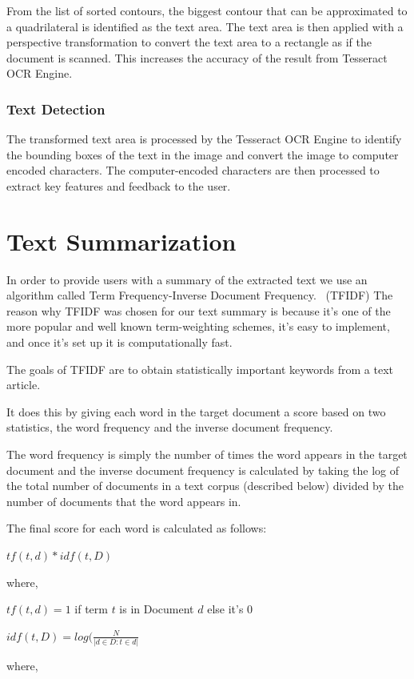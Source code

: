 From the list of sorted contours, the biggest contour that can be approximated to a quadrilateral is identified as the text area. The text area is then applied with a perspective transformation to convert the text area to a rectangle	 as if the document is scanned. This increases the accuracy of the result from Tesseract OCR Engine. 

\subsubsection{Text Detection}
The transformed text area is processed by the Tesseract OCR Engine to identify the bounding boxes of the text in the image and convert the image to computer encoded characters. The computer-encoded characters are then processed to extract key features and feedback to the user.

\section{Text Summarization}
In order to provide users with a summary of the extracted text we use an algorithm called Term Frequency-Inverse Document Frequency.\footnotemark {} ~(TFIDF) The reason why TFIDF was chosen for our text summary is because it's one of the more popular and well known term-weighting schemes, it's easy to implement, and once it's set up it is computationally fast.

The goals of TFIDF are to obtain statistically important keywords from a text article. 

It does this by giving each word in the target document a score based on two statistics, the word frequency and the inverse document frequency.

The word frequency is simply the number of times the word appears in the target document and the inverse document frequency is calculated by taking the log of the total number of documents in a text corpus (described below) divided by the number of documents that the word appears in.

The final score for each word is calculated as follows: 

	\forceindent $tf(t, d) * idf(t, D)$  

where,

	\forceindent $tf(t, d) = 1$ if term $t$	is in Document $d$ else it's $0$

	\forceindent $idf(t, D) = log(\frac{N}{|d \in D : t \in d|}$

where,

